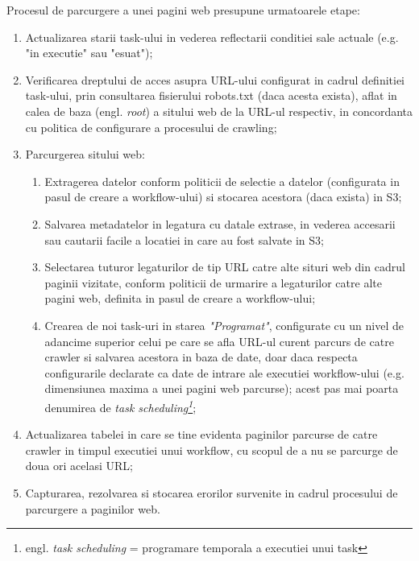 \noindent
Procesul de parcurgere a unei pagini web presupune urmatoarele etape:

\begin{enumerate}
	\item{Actualizarea starii task-ului in vederea reflectarii conditiei sale actuale (e.g. "in executie" sau "esuat");}
	
	\item{Verificarea dreptului de acces asupra URL-ului configurat in cadrul definitiei task-ului, prin consultarea fisierului robots.txt (daca acesta exista), aflat in calea de baza (engl. \textit{root}) a sitului web de la URL-ul respectiv, in concordanta cu politica de configurare a procesului de crawling;}
	
	\item{Parcurgerea sitului web:}
	\begin{enumerate}
		\item{Extragerea datelor conform politicii de selectie a datelor (configurata in pasul de creare a workflow-ului) si stocarea acestora (daca exista) in S3;}
		
		\item{Salvarea metadatelor in legatura cu datale extrase, in vederea accesarii sau cautarii facile a locatiei in care au fost salvate in S3;}
		
		\item{Selectarea tuturor legaturilor de tip URL catre alte situri web din cadrul paginii vizitate, conform politicii de urmarire a legaturilor catre alte pagini web, definita in pasul de creare a workflow-ului;}
		
		\item{Crearea de noi task-uri in starea \textit{"Programat"}, configurate cu un nivel de adancime superior celui pe care se afla URL-ul curent parcurs de catre crawler si salvarea acestora in baza de date, doar daca respecta configurarile declarate ca date de intrare ale executiei workflow-ului (e.g. dimensiunea maxima a unei pagini web parcurse); acest pas mai poarta denumirea de \textit{task scheduling\footnote{engl. \textit{task scheduling} = programare temporala a executiei unui task}};}
		
	\end{enumerate}
	
	\item{Actualizarea tabelei in care se tine evidenta paginilor parcurse de catre crawler in timpul executiei unui workflow, cu scopul de a nu se parcurge de doua ori acelasi URL;}
		
	\item{Capturarea, rezolvarea si stocarea erorilor survenite in cadrul procesului de parcurgere a paginilor web.}
	
\end{enumerate}

